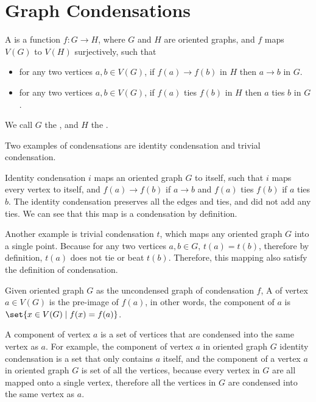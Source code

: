\section{Graph Condensations}

\begin{definition}
  A  is a function \(f: G \to H\),
  where \(G\) and \(H\) are oriented graphs,
  and \(f\) maps \(V(G)\) to \(V(H)\) surjectively,
  such that
  \begin{itemize}
    \item for any two vertices \(a, b \in V(G)\),
      if \(f(a) \to f(b)\) in \(H\)
      then \(a \to b\) in \(G\).
    \item for any two vertices \(a, b \in V(G)\),
      if \(f(a)\) ties \(f(b)\) in \(H\)
      then \(a\) ties \(b\) in \(G\).
  \end{itemize}
  We call \(G\) the ,
  and \(H\) the .
\end{definition}

Two examples of condensations are identity condensation
and trivial condensation.

Identity condensation \(i\) maps an oriented graph \(G\) to itself,
such that \(i\) maps every vertex to itself,
and \(f(a) \to f(b)\) if \(a \to b\)
and \(f(a)\) ties \(f(b)\) if \(a\) ties \(b\).
The identity condensation preserves all the edges
and ties, and did not add any ties.
We can see that this map is a condensation by definition.

Another example is trivial condensation \(t\),
which maps any oriented graph \(G\) into a single point.
Because for any two vertices \(a, b \in G\),
\(t(a) = t(b)\), therefore by definition,
\(t(a)\) does not tie or beat \(t(b)\).
Therefore, this mapping also satisfy the definition of condensation.

\begin{definition}
  Given oriented graph \(G\) as the uncondensed graph of
  condensation \(f\),
  A  of vertex \(a \in V(G)\)
  is the pre-image of \(f(a)\),
  in other words, the component of \(a\) is
  \(\set{x \in V(G) \mid f(x) = f(a)}\).
\end{definition}

A component of vertex \(a\) is a set of vertices
that are condensed into the same vertex as \(a\).
For example, the component of vertex \(a\) in oriented graph \(G\)
identity condensation is a set that only contains \(a\) itself,
and the component of a vertex \(a\) in oriented graph \(G\)
is set of all the vertices,
because every vertex in \(G\) are all mapped onto a single vertex,
therefore all the vertices in \(G\) are
condensed into the same vertex as \(a\).

